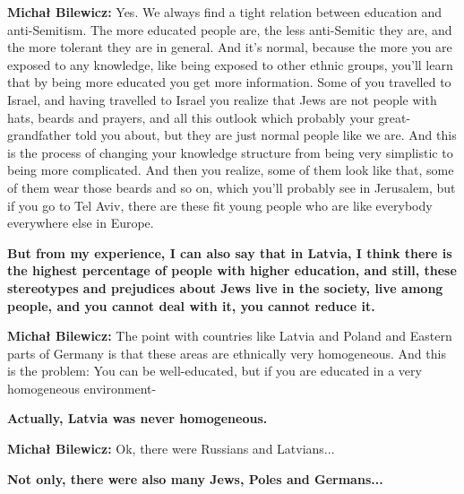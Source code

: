\textbf{Michał Bilewicz:} Yes. We always find a tight relation between education and anti-Semitism. The more educated people are, the less anti-Semitic they are, and the more tolerant they are in general. And it’s normal, because the more you are exposed to any knowledge, like being exposed to other ethnic groups, you'll learn that by being more educated you get more information. Some of you travelled to Israel, and having travelled to Israel you realize that Jews are not people with hats, beards and prayers, and all this outlook which probably your great-grandfather told you about, but they are just normal people like we are. And this is the process of changing your knowledge structure from being very simplistic to being more complicated. And then you realize, some of them look like that, some of them wear those beards and so on, which you'll probably see in Jerusalem, but if you go to Tel Aviv, there are these fit young people who are like everybody everywhere else in Europe. 

\textbf{But from my experience, I can also say that in Latvia, I think there is the highest percentage of people with higher education, and still, these stereotypes and prejudices about Jews live in the society, live among people, and you cannot deal with it, you cannot reduce it.} 

\textbf{Michał Bilewicz:} The point with countries like Latvia and Poland and Eastern parts of Germany is that these areas are ethnically very homogeneous. And this is the problem: You can be well-educated, but if you are educated in a very homogeneous environment-

\textbf{Actually, Latvia was never homogeneous.}

\textbf{Michał Bilewicz:} Ok, there were Russians and Latvians...

\textbf{Not only, there were also many Jews, Poles and Germans...}

